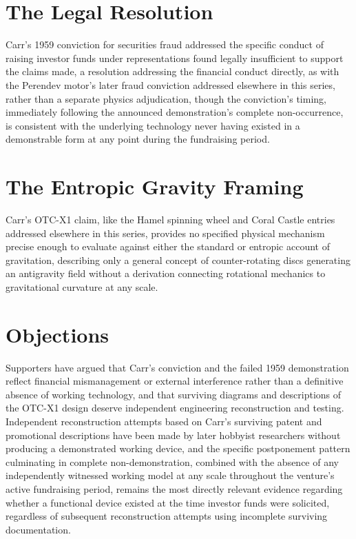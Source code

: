 \documentclass[11pt]{article}
\begin{document}
\section{The Legal Resolution}

Carr's 1959 conviction for securities fraud addressed the specific conduct of raising investor funds under representations found legally insufficient to support the claims made, a resolution addressing the financial conduct directly, as with the Perendev motor's later fraud conviction addressed elsewhere in this series, rather than a separate physics adjudication, though the conviction's timing, immediately following the announced demonstration's complete non-occurrence, is consistent with the underlying technology never having existed in a demonstrable form at any point during the fundraising period.

\section{The Entropic Gravity Framing}

Carr's OTC-X1 claim, like the Hamel spinning wheel and Coral Castle entries addressed elsewhere in this series, provides no specified physical mechanism precise enough to evaluate against either the standard or entropic account of gravitation, describing only a general concept of counter-rotating discs generating an antigravity field without a derivation connecting rotational mechanics to gravitational curvature at any scale.

\section{Objections}

Supporters have argued that Carr's conviction and the failed 1959 demonstration reflect financial mismanagement or external interference rather than a definitive absence of working technology, and that surviving diagrams and descriptions of the OTC-X1 design deserve independent engineering reconstruction and testing. Independent reconstruction attempts based on Carr's surviving patent and promotional descriptions have been made by later hobbyist researchers without producing a demonstrated working device, and the specific postponement pattern culminating in complete non-demonstration, combined with the absence of any independently witnessed working model at any scale throughout the venture's active fundraising period, remains the most directly relevant evidence regarding whether a functional device existed at the time investor funds were solicited, regardless of subsequent reconstruction attempts using incomplete surviving documentation.
\end{document}
